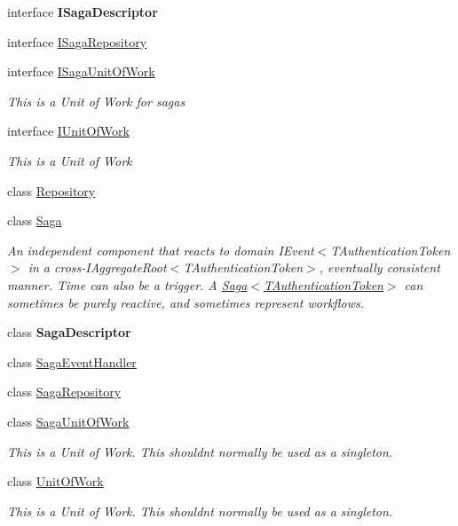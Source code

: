 \begin{DoxyCompactItemize}
interface {\bfseries I\+Saga\+Descriptor}
\item 
interface \hyperlink{interfaceCqrs_1_1Domain_1_1ISagaRepository}{I\+Saga\+Repository}
\item 
interface \hyperlink{interfaceCqrs_1_1Domain_1_1ISagaUnitOfWork}{I\+Saga\+Unit\+Of\+Work}
\begin{DoxyCompactList}\small\item\em This is a Unit of Work for sagas \end{DoxyCompactList}\item 
interface \hyperlink{interfaceCqrs_1_1Domain_1_1IUnitOfWork}{I\+Unit\+Of\+Work}
\begin{DoxyCompactList}\small\item\em This is a Unit of Work \end{DoxyCompactList}\item 
class \hyperlink{classCqrs_1_1Domain_1_1Repository}{Repository}
\item 
class \hyperlink{classCqrs_1_1Domain_1_1Saga}{Saga}
\begin{DoxyCompactList}\small\item\em An independent component that reacts to domain I\+Event$<$\+T\+Authentication\+Token$>$ in a cross-\/I\+Aggregate\+Root$<$\+T\+Authentication\+Token$>$, eventually consistent manner. Time can also be a trigger. A \hyperlink{classCqrs_1_1Domain_1_1Saga_a1b6019cecbbf2572b64dd456cb5d91a2_a1b6019cecbbf2572b64dd456cb5d91a2}{Saga$<$\+T\+Authentication\+Token$>$} can sometimes be purely reactive, and sometimes represent workflows. \end{DoxyCompactList}\item 
class {\bfseries Saga\+Descriptor}
\item 
class \hyperlink{classCqrs_1_1Domain_1_1SagaEventHandler}{Saga\+Event\+Handler}
\item 
class \hyperlink{classCqrs_1_1Domain_1_1SagaRepository}{Saga\+Repository}
\item 
class \hyperlink{classCqrs_1_1Domain_1_1SagaUnitOfWork}{Saga\+Unit\+Of\+Work}
\begin{DoxyCompactList}\small\item\em This is a Unit of Work. This shouldn\textquotesingle{}t normally be used as a singleton. \end{DoxyCompactList}\item 
class \hyperlink{classCqrs_1_1Domain_1_1UnitOfWork}{Unit\+Of\+Work}
\begin{DoxyCompactList}\small\item\em This is a Unit of Work. This shouldn\textquotesingle{}t normally be used as a singleton. \end{DoxyCompactList}\end{DoxyCompactItemize}
